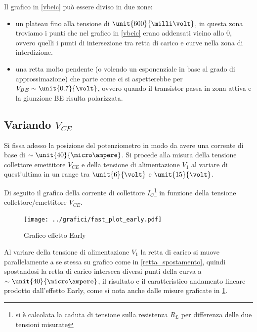 \documentclass[10pt,a4paper]{article}
\begin{document}
Il grafico in \figurename{\ref{vbeic}} può essere diviso in due zone:
\begin{itemize}
	\item un plateau fino alla tensione di $\unit{600}{\milli\volt}$, in questa zona troviamo i punti che nel grafico in \figurename{\ref{vbeic}} erano addensati vicino allo $0$, ovvero quelli i punti di intersezione tra retta di carico e curve nella zona di interdizione.
	\item una retta molto pendente (o volendo un esponenziale in base al grado di approssimazione) che parte come ci si aspetterebbe per $V_{BE} \sim \unit{0.7}{\volt}$, ovvero quando il transistor passa in zona attiva e la giunzione BE risulta polarizzata.
\end{itemize}

\subsection{Variando $V_{CE}$}
Si fissa adesso la posizione del potenziometro in modo da avere una corrente di base di $\sim \unit{40}{\micro\ampere}$. Si procede alla misura della tensione collettore emettitore $V_{CE}$ e della tensione di alimentazione $V_1$ al variare di quest'ultima in un range tra $\unit{6}{\volt}$ e $\unit{15}{\volt}$.

Di seguito il grafico della corrente di collettore $I_C$\footnote{si è calcolata la caduta di tensione sulla resistenza $R_L$ per differenza delle due tensioni misurate} in funzione della tensione collettore/emettitore $V_{CE}$.

\begin{figure}[h!]
	\centering
	\begin{minipage}[h!]{0.3\textwidth}
		\centering
		\resizebox{\textwidth}{!}{
			}
	\end{minipage}
	\begin{minipage}[d]{0.69\textwidth}
		\centering
		\texttt{[image: ../grafici/fast\_plot\_early.pdf]}
		\caption{Grafico effetto Early}
		\label{early}
	\end{minipage}
\end{figure}

Al variare della tensione di alimentazione $V_1$ la retta di carico si muove parallelamente a se stessa su grafico come in \figurename{\ref{retta_spostamento}}, quindi spostandosi la retta di carico interseca diversi punti della curva a  $\sim \unit{40}{\micro\ampere}$, il risultato e il caratteristico andamento lineare prodotto dall'effetto Early, come si nota anche dalle misure graficate in \figurename{\ref{early}}.
\end{document}
